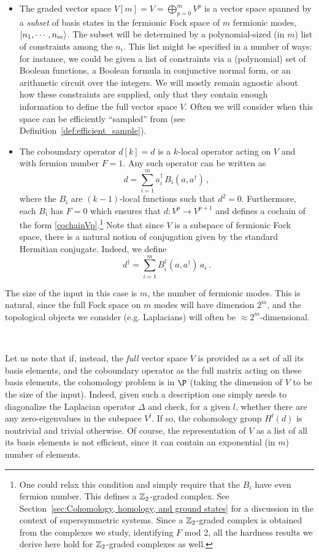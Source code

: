 \documentclass[11pt]{article}
\numberwithin{equation}{section}
\newcommand\equ[1] {\begin{equation}#1\end{equation}}
\renewcommand\( {\left(}
\renewcommand\) {\right)}
\begin{document}
\begin{itemize}
    \item The graded vector space $V[m] = V = \bigoplus_{p=0}^m V^p$ is a vector space spanned by a {\it subset} of basis states in the fermionic Fock space of $m$ fermionic modes, $\ket{n_{1},\cdots,n_{m}}$. The subset will be determined by a polynomial-sized (in $m$) list of constraints among the $n_{i}$. This list might be specified in a number of ways: for instance, we could be given a list of constraints via a (polynomial) set of Boolean functions, a Boolean formula in conjunctive normal form, or an arithmetic circuit over the integers. We will mostly remain agnostic about how these constraints are supplied, only that they contain enough information to define the full vector space $V$. Often we will consider when this space can be efficiently ``sampled'' from (see Definition~\ref{def:efficient_sample}).
    
    \item The coboundary operator $d[k] = d$ is a $k$-local operator acting on $V$ and with fermion number $F=1$. Any such operator can be written as 
\equ{\label{dB}
d=\sum_{i=1}^{m}a_{i}^{\dagger}\, B_{i}(a,a^{\dagger})\,,
}
where the $B_{i}$ are $(k-1)$-local functions  such that $d^{2}=0$. Furthermore, each $B_i$ has $F=0$ which ensures that  $d:V^{p}\to V^{p+1}$ and defines a cochain of the form \eqref{cochainVp}.\footnote{One could relax this condition and simply require that the $B_{i}$ have even fermion number. This defines a $\Bbb Z_{2}$-graded complex. See Section~\ref{sec:Cohomology, homology, and ground states} for a discussion in the context of supersymmetric systems. Since a $\Bbb Z_{2}$-graded complex is obtained from the complexes we study, identifying $F$ mod 2, all the hardness results we derive here hold for $\Bbb Z_{2}$-graded complexes as well. } Note that since $V$ is a subspace of fermionic Fock space, there is a natural notion of conjugation given by the standard Hermitian conjugate. Indeed, we define
\equ{\label{dBd}
d^{\dagger}=\sum_{i=1}^{m} B_{i}^{\dagger}(a,a^{\dagger})\, a_{i}\,.
}
\end{itemize}
The size of the input in this case is $m$, the number of fermionic modes. This is natural, since the full Fock space on $m$ modes will have dimension $2^m$, and the topological objects we consider (e.g. Laplacians) will often be $\approx 2^m$-dimensional.

 
\

Let us note that if, instead,  the {\it full} vector space $V$ is provided as a set of all its basis elements, and the coboundary operator as the full matrix acting on these basis elements, the cohomology problem is in $\P$ (taking  the dimension of $V$ to be the size of the input). Indeed, given such a description one simply needs to diagonalize the Laplacian operator $\Delta$ and check, for a given $l$, whether there are any zero-eigenvalues in the subspace $V^{l}$. If so, the cohomology group $H^{l}(d)$ is nontrivial and trivial otherwise. Of course, the representation of $V$ as a list of all its basis elements is not efficient, since it can contain an exponential (in $m$) number of elements. 
\end{document}
